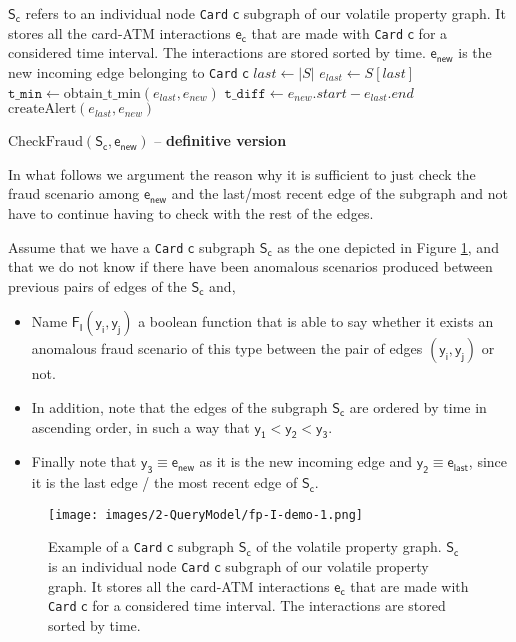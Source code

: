 \begin{algorithm}[H]
  \small
  \begin{algorithmic}[1]
   \REQUIRE $\mathsf{S_c}$ refers to an individual node \texttt{Card} $\mathsf{c}$ subgraph of our volatile property graph. It stores all the card-ATM interactions $\mathsf{e_c}$ that are made with \texttt{Card} $\mathsf{c}$ for a considered time interval. The interactions are stored sorted by time.
   \REQUIRE $\mathsf{e_{new}}$ is the new incoming edge belonging to \texttt{Card} $\mathsf{c}$
  \STATE $last \gets |S|$
  \STATE $e_{last} \gets S[last]$
  \STATE $\texttt{t\_min} \gets \text{obtain\_t\_min}(e_{last}, e_{new})$
  \STATE $\texttt{t\_diff} \gets e_{new}.start - e_{last}.end$
    \STATE $\text{createAlert}(e_{last}, e_{new})$
  \ENDIF
  \end{algorithmic}
  \caption{$\text{CheckFraud}(\mathsf{S_c}, \mathsf{e_{new}})$ -- \textbf{definitive version}}
  \label{alg:check-fraud-def}
\end{algorithm}


In what follows we argument the reason why it is sufficient to just check the fraud scenario among $\mathsf{e_{new}}$ and the last/most recent edge of the subgraph and not have to continue having to check with the rest of the edges.

Assume that we have a \texttt{Card} $\mathsf{c}$ subgraph $\mathsf{S_c}$ as the one depicted in Figure \ref{img:fp-I-demo}, and that we do not know if there have been anomalous scenarios produced between previous pairs of edges of the $\mathsf{S_c}$ and,
\begin{itemize}
    \item Name $\mathsf{F_I(y_i,y_j)}$ a boolean function that is able to say whether it exists an anomalous fraud scenario of this type between the pair of edges $\mathsf{(y_i,y_j)}$ or not.
    \item In addition, note that the edges of the subgraph $\mathsf{S_c}$ are ordered by time in ascending order, in such a way that $\mathsf{y_1} < \mathsf{y_2} < \mathsf{y_3}$.
    \item Finally note that $\mathsf{y_3} \equiv \mathsf{e_{new}}$ as it is the new incoming edge and $\mathsf{y_2} \equiv \mathsf{e_{last}}$, since it is the last edge / the most recent edge of $\mathsf{S_c}$.
\end{itemize} 

\begin{figure}[H]
  \centering
  \texttt{[image: images/2-QueryModel/fp-I-demo-1.png]}
  \caption{Example of a \texttt{Card} $\mathsf{c}$ subgraph $\mathsf{S_c}$ of the volatile property graph. $\mathsf{S_c}$ is an individual node \texttt{Card} $\mathsf{c}$ subgraph of our volatile property graph. It stores all the card-ATM interactions $\mathsf{e_c}$ that are made with \texttt{Card} $\mathsf{c}$ for a considered time interval. The interactions are stored sorted by time.}
  \label{img:fp-I-demo}
\end{figure}


